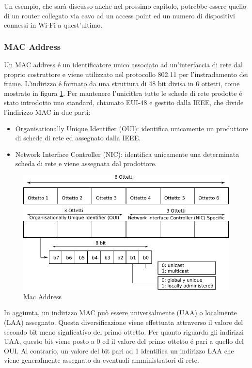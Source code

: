 Un esempio, che sar\`a discusso anche nel prossimo capitolo, potrebbe essere quello di un router collegato via cavo ad un access point ed un numero di dispositivi connessi in Wi-Fi a quest'ultimo.

\newpage

\subsubsection{MAC Address}

Un MAC address \'e un identificatore unico associato ad un'interfaccia di rete dal proprio costruttore e viene utilizzato nel protocollo 802.11 per l'instradamento dei frame.
L'indirizzo \'e formato da una struttura di 48 bit divisa in 6 ottetti, come mostrato in figura \ref{fig:macaddress}.
Per mantenere l'unicit\`tra tutte le schede di rete prodotte \'e stato introdotto uno standard, chiamato EUI-48 e gestito dalla IEEE, che divide l'indirizzo MAC in due parti:
\begin{itemize}
	\item Organisationally Unique Identifier (OUI): identifica unicamente un produttore di schede di rete ed assegnato dalla IEEE.
	\item Network Interface Controller (NIC): identifica unicamente una determinata scheda di rete e viene assegnata dal prodottore.
\end{itemize}

\begin{figure}[!htb]
	\centering
	\includegraphics{images/img7.pdf}
	\caption{Mac Address}
	\label{fig:macaddress}
\end{figure}

In aggiunta, un indirizzo MAC pu\`o essere universalmente (UAA) o localmente (LAA) assegnato.
Questa diversificazione viene effettuata attraverso il valore del secondo bit meno signficativo del primo ottetto.
Per quanto riguarda gli indirizzi UAA, questo bit viene posto a 0 ed il valore del primo ottetto \'e pari a quello del OUI.
Al contrario, un valore del bit pari ad 1 identifica un indirizzo LAA che viene generalmente assegnato da eventuali amministratori di rete.

